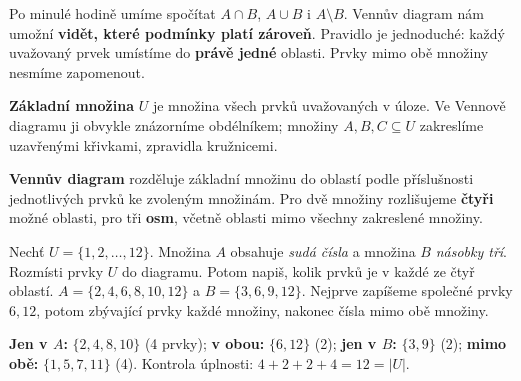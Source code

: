 \documentclass[11pt,a4paper]{article}
\begin{document}
Po minulé hodině umíme spočítat $A\cap B$, $A\cup B$ i $A\setminus B$.
Vennův diagram nám umožní \textbf{vidět, které podmínky platí zároveň}.
Pravidlo je jednoduché: každý uvažovaný prvek umístíme do \textbf{právě
jedné} oblasti. Prvky mimo obě množiny nesmíme zapomenout.

\begin{definiceBox}[title={Definice - Základní množina}]
\textbf{Základní množina} $U$ je množina všech prvků uvažovaných v úloze.
Ve Vennově diagramu ji obvykle znázorníme obdélníkem; množiny
$A,B,C\subseteq U$ zakreslíme uzavřenými křivkami, zpravidla kružnicemi.
\end{definiceBox}
\begin{definiceBox}[title={Definice - Vennův diagram}]
\textbf{Vennův diagram} rozděluje základní množinu do oblastí
podle příslušnosti jednotlivých prvků ke zvoleným množinám.
Pro dvě množiny rozlišujeme \textbf{čtyři} možné oblasti, pro tři
\textbf{osm}, včetně oblasti mimo všechny zakreslené množiny.
\end{definiceBox}


\begin{prikladReseniBox}[title={Příklad 1}]
Nechť $U=\{1,2,\ldots,12\}$. Množina $A$ obsahuje \emph{sudá čísla}
a množina $B$ \emph{násobky tří}. Rozmísti prvky $U$ do diagramu.
Potom napiš, kolik prvků je v každé ze čtyř oblastí.
\tcblower
$A=\{2,4,6,8,10,12\}$ a $B=\{3,6,9,12\}$.
Nejprve zapíšeme společné prvky $6,12$, potom zbývající prvky každé
množiny, nakonec čísla mimo obě množiny.
\begin{center}
\end{center}
\textbf{Jen v $A$:} $\{2,4,8,10\}$ (4 prvky); \textbf{v obou:}
$\{6,12\}$ (2); \textbf{jen v $B$:} $\{3,9\}$ (2);
\textbf{mimo obě:} $\{1,5,7,11\}$ (4).
Kontrola úplnosti: $4+2+2+4=12=|U|$.
\end{prikladReseniBox}
\end{document}
